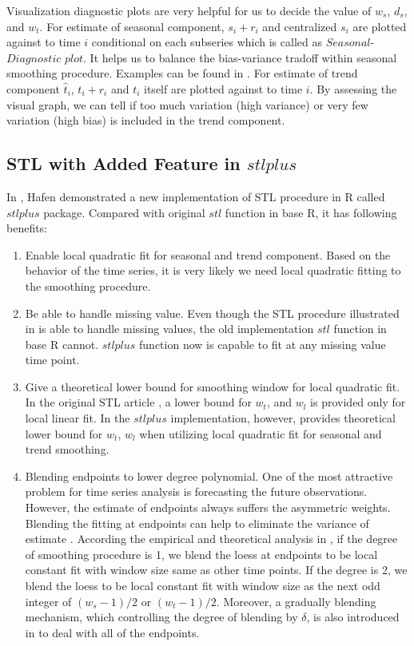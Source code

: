 Visualization diagnostic plots are very helpful for us to decide the value of 
$w_s$, $d_s$, and $w_t$. For estimate of seasonal component, $s_i + r_i$ and 
centralized $s_i$ are plotted against to time $i$ conditional on each subseries 
which is called as $Seasonal$-$Diagnostic$ $plot$. It helps us to balance the
bias-variance tradoff within seasonal smoothing procedure. Examples can be found
in \cite{Cleveland:1990}.
For estimate of trend component $\hat t_i$, $t_i + r_i$ and $t_i$ itself are 
plotted against to time $i$. By assessing the visual graph, we can tell if too
much variation (high variance) or very few variation (high bias) is included in
the trend component.

\subsection{STL with Added Feature in $stlplus$}

In \cite{hafen2010local}, Hafen demonstrated a new implementation of STL procedure
in R called $stlplus$ package. Compared with original $stl$ function in base R,
it has following benefits:

\begin{enumerate}
\item Enable local quadratic fit for seasonal and trend component. Based on the
behavior of the time series, it is very likely we need local quadratic fitting
to the smoothing procedure.
\item Be able to handle missing value. Even though the STL procedure illustrated
in \cite{Cleveland:1990} is able to handle missing values, the old implementation
$stl$ function in base R cannot. $stlplus$ function now is capable to fit at
any missing value time point.
\item Give a theoretical lower bound for smoothing window for local quadratic fit.
In the original STL article \cite{Cleveland:1990}, a lower bound for $w_t$, and
$w_l$ is provided only for local linear fit. In the $stlplus$ implementation, 
however, \cite{hafen2010local} provides theoretical lower bound for $w_t$, $w_l$ 
when utilizing local quadratic fit for seasonal and trend smoothing.
\item Blending endpoints to lower degree polynomial. One of the most attractive
problem for time series analysis is forecasting the future observations. However,
the estimate of endpoints always suffers the asymmetric weights. Blending the 
fitting at endpoints can help to eliminate the variance of estimate
\cite{hafen2010local}. According the empirical and theoretical analysis in 
\cite{hafen2010local}, if the degree of smoothing procedure is 1, we blend the 
loess at endpoints to be local constant fit with window size same as other time
points. If the degree is 2, we blend the loess to be local constant fit with 
window size as the next odd integer of $(w_s - 1)/2$ or $(w_t - 1)/2$. Moreover,
a gradually blending mechanism, which controlling the degree of blending by 
$\delta$, is also introduced in \cite{hafen2010local} to deal with all of the 
endpoints.
\end{enumerate}


